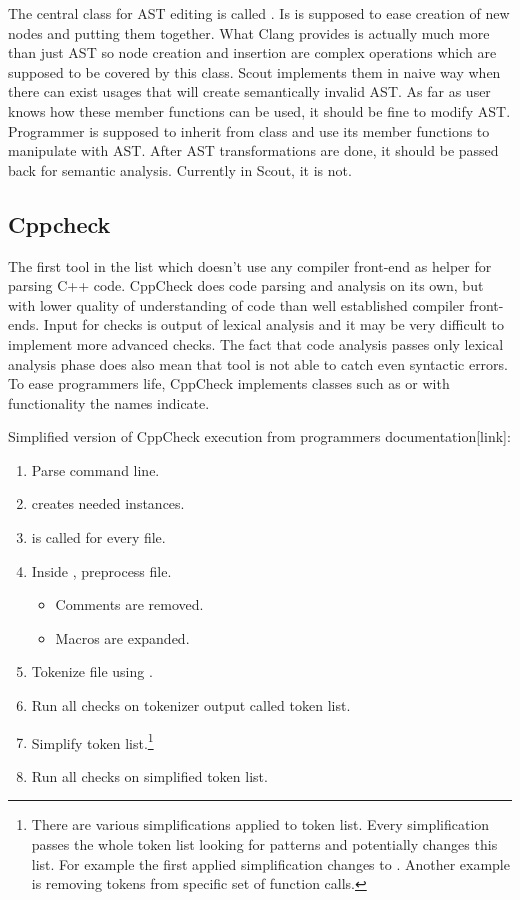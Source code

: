 The central class for AST editing is called . Is is supposed to ease creation of new nodes and putting them together. What Clang provides is actually much more than just AST so node creation and insertion are complex operations which are supposed to be covered by this class. Scout implements them in naive way when there can exist usages that will create semantically invalid AST. As far as user knows how these member functions can be used, it should be fine to modify AST. Programmer is supposed to inherit from  class and use its member functions to manipulate with AST. After AST transformations are done, it should be passed back for semantic analysis. Currently in Scout, it is not.

\subsection{Cppcheck}
The first tool in the list which doesn't use any compiler front-end as helper for parsing C++ code. CppCheck does code parsing and analysis on its own, but with lower quality of understanding of code than well established compiler front-ends. Input for checks is output of lexical analysis and it may be very difficult to implement more advanced checks. The fact that code analysis passes only lexical analysis phase does also mean that tool is not able to catch even syntactic errors. To ease programmers life, CppCheck implements classes such as  or  with functionality the names indicate.

Simplified version of CppCheck execution from programmers documentation[link]:

\begin{enumerate}
\item Parse command line.
\item {} creates needed  instances.
\item {} is called for every file.
\item Inside , preprocess file.
    \begin{itemize}
    \item Comments are removed.
    \item Macros are expanded.
    \end{itemize}
\item Tokenize file using .
\item Run all checks on tokenizer output called token list.
\item Simplify token list.\footnote{There are various simplifications applied to token list. Every simplification passes the whole token list looking for patterns and potentially changes this list. For example the first applied simplification changes  to . Another example is removing  tokens from specific set of function calls.}
\item Run all checks on simplified token list.
\end{enumerate}
